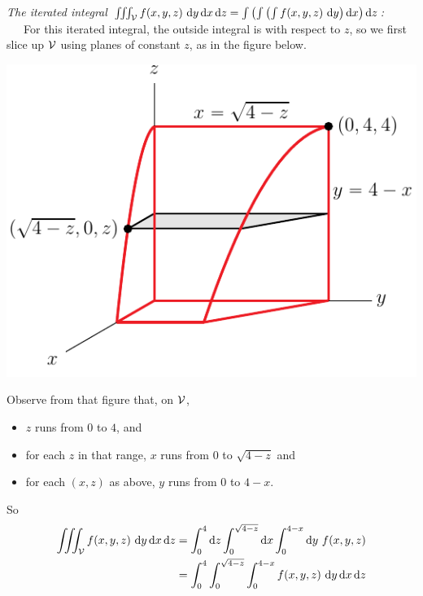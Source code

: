 \begin{eg}
\goodbreak\noindent
\emph{The iterated integral 
   $\iiint_{\mathcal{V}} f(x, y, z)\ \mathrm{d}y\,\mathrm{d}x \,\mathrm{d}z
   =\int\left(\int\left(\int f(x, y, z)\ \mathrm{d}y\right)\mathrm{d}x \right)\mathrm{d}z$:}
    \ \ \ 
For this iterated integral, the outside integral is with respect to
$z$, so we first slice up $\mathcal{V}$ using planes of constant $z$,
as in the figure below.
\begin{nfig}
\begin{center}
    \includegraphics{limits3dE.pdf}
\end{center}
\end{nfig}
Observe from that figure that, on $\mathcal{V}$,
\begin{itemize} \itemsep1pt \parskip0pt 
\item
$z$ runs from $0$ to $4$, and
\item
for each $z$ in that range, $x$ runs from $0$ to $\sqrt{4-z}$ and
\item
for each $(x,z)$ as above,
$y$ runs from $0$ to $4-x$.
\end{itemize}
So
\begin{align*}
\iiint_{\mathcal{V}} f(x, y, z)\ \mathrm{d}y\,\mathrm{d}x \,\mathrm{d}z
&=\int_0^4 \mathrm{d}z \int_0^{\sqrt{4-z}} \mathrm{d}x\int_0^{4-x}\mathrm{d}y\  f(x, y, z)\\
&=\int_0^4  \int_0^{\sqrt{4-z}} \int_0^{4-x}f(x, y, z)
            \ \mathrm{d}y\,\mathrm{d}x\,\mathrm{d}z
\end{align*}

\end{eg}

